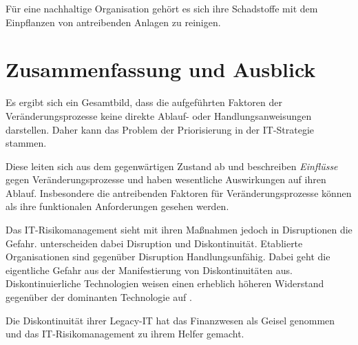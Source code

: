 Für eine nachhaltige Organisation gehört es sich ihre Schadstoffe mit dem Einpflanzen von antreibenden Anlagen zu reinigen.

\section{Zusammenfassung und Ausblick}
Es ergibt sich ein Gesamtbild, dass die aufgeführten Faktoren der Veränderungsprozesse keine direkte Ablauf- oder Handlungsanweisungen darstellen. Daher kann das Problem der Priorisierung in der IT-Strategie stammen.

Diese leiten sich aus dem gegenwärtigen Zustand ab und beschreiben \emph{Einflüsse} gegen Veränderungsprozesse und haben wesentliche Auswirkungen auf ihren Ablauf. Insbesondere die antreibenden Faktoren für Veränderungsprozesse können als ihre funktionalen Anforderungen gesehen werden.

Das IT-Risikomanagement sieht mit ihren Maßnahmen jedoch in Disruptionen die Gefahr. \citet{Fernandez:2020} unterscheiden dabei Disruption und Diskontinuität. Etablierte Organisationen sind gegenüber Disruption Handlungsunfähig. Dabei geht die eigentliche Gefahr aus der Manifestierung von Diskontinuitäten aus. Diskontinuierliche Technologien weisen einen erheblich höheren Widerstand gegenüber der dominanten Technologie auf \cite{Fernandez:2020}. 

Die Diskontinuität ihrer Legacy-IT hat das Finanzwesen als Geisel genommen und das IT-Risikomanagement zu ihrem Helfer gemacht.

